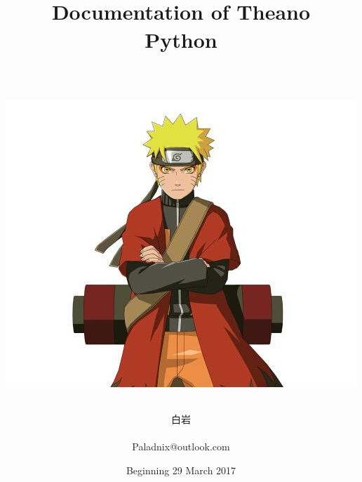 \usepackage{colortbl}
\usepackage{xcolor}



\usepackage{graphicx}   %
\usepackage{makeidx}   
\usepackage{float}
\usepackage{amsmath}    %
\usepackage{amssymb}
\usepackage{multirow}
\usepackage{booktabs}
\usepackage{setspace}
\usepackage{fontspec}
\usepackage{lipsum}
\usepackage{enumerate}
\usepackage{comment}
\usepackage{longtable}
\usepackage{array}







\frontmatter %
\title{
\begin{center}
\HRule \\[0.4cm]
{\Huge \bfseries Documentation of Theano \\[0.5cm] \Large Python }\\[0.4cm] %
\HRule \\[1.5cm]
\end{center}
\begin{center}
	\includegraphics[width=0.5\linewidth]{img/naruto.jpg}
\end{center}
}
\author{\Huge 白岩 \\ \\ \LARGE Paladnix@outlook.com \\[2cm]} %
\date{Beginning 29 March 2017} %
\maketitle

